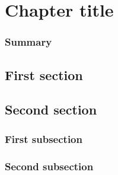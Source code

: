 \chapter{Chapter title}

\subsection*{Summary}
\blindtext

\section{First section}
\Blindtext

\section{Second section}
\blindtext

\subsection{First subsection}
\blindtext

\subsection{Second subsection}
\blindtext